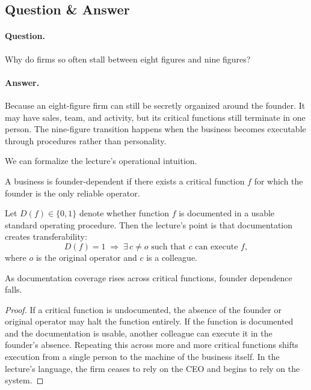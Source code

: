 \subsection{Question \& Answer}

\paragraph{Question.} Why do firms so often stall between eight figures and nine figures?

\paragraph{Answer.} Because an eight-figure firm can still be secretly organized around the founder. It may have sales, team, and activity, but its critical functions still terminate in one person. The nine-figure transition happens when the business becomes executable through procedures rather than personality.

We can formalize the lecture's operational intuition.

\begin{definition}
A business is founder-dependent if there exists a critical function \(f\) for which the founder is the only reliable operator.
\end{definition}

Let \(D(f)\in\{0,1\}\) denote whether function \(f\) is documented in a usable standard operating procedure. Then the lecture's point is that documentation creates transferability:
\begin{equation}
D(f)=1 \;\Rightarrow\; \exists\,c\neq o \text{ such that } c \text{ can execute } f,
\end{equation}
where \(o\) is the original operator and \(c\) is a colleague.

\begin{proposition}
As documentation coverage rises across critical functions, founder dependence falls.
\end{proposition}

\begin{proof}
If a critical function is undocumented, the absence of the founder or original operator may halt the function entirely. If the function is documented and the documentation is usable, another colleague can execute it in the founder's absence. Repeating this across more and more critical functions shifts execution from a single person to the machine of the business itself. In the lecture's language, the firm ceases to rely on the CEO and begins to rely on the system.
\end{proof}

